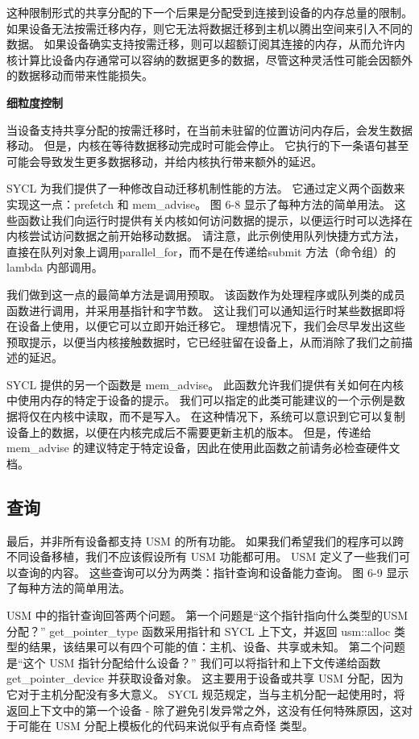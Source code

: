 这种限制形式的共享分配的下一个后果是分配受到连接到设备的内存总量的限制。 如果设备无法按需迁移内存，则它无法将数据迁移到主机以腾出空间来引入不同的数据。 如果设备确实支持按需迁移，则可以超额订阅其连接的内存，从而允许内核计算比设备内存通常可以容纳的数据更多的数据，尽管这种灵活性可能会因额外的数据移动而带来性能损失。

\textbf{细粒度控制}

当设备支持共享分配的按需迁移时，在当前未驻留的位置访问内存后，会发生数据移动。 但是，内核在等待数据移动完成时可能会停止。 它执行的下一条语句甚至可能会导致发生更多数据移动，并给内核执行带来额外的延迟。

SYCL 为我们提供了一种修改自动迁移机制性能的方法。 它通过定义两个函数来实现这一点：prefetch 和 mem\_advise。 图 6-8 显示了每种方法的简单用法。 这些函数让我们向运行时提供有关内核如何访问数据的提示，以便运行时可以选择在内核尝试访问数据之前开始移动数据。 请注意，此示例使用队列快捷方式方法，直接在队列对象上调用parallel\_for，而不是在传递给submit 方法（命令组）的 lambda 内部调用。

我们做到这一点的最简单方法是调用预取。 该函数作为处理程序或队列类的成员函数进行调用，并采用基指针和字节数。 这让我们可以通知运行时某些数据即将在设备上使用，以便它可以立即开始迁移它。 理想情况下，我们会尽早发出这些预取提示，以便当内核接触数据时，它已经驻留在设备上，从而消除了我们之前描述的延迟。

SYCL 提供的另一个函数是 mem\_advise。 此函数允许我们提供有关如何在内核中使用内存的特定于设备的提示。 我们可以指定的此类可能建议的一个示例是数据将仅在内核中读取，而不是写入。 在这种情况下，系统可以意识到它可以复制设备上的数据，以便在内核完成后不需要更新主机的版本。 但是，传递给 mem\_advise 的建议特定于特定设备，因此在使用此函数之前请务必检查硬件文档。

\subsection{查询}
最后，并非所有设备都支持 USM 的所有功能。 如果我们希望我们的程序可以跨不同设备移植，我们不应该假设所有 USM 功能都可用。 USM 定义了一些我们可以查询的内容。 这些查询可以分为两类：指针查询和设备能力查询。 图 6-9 显示了每种方法的简单用法。

USM 中的指针查询回答两个问题。 第一个问题是“这个指针指向什么类型的USM分配？” get\_pointer\_type 函数采用指针和 SYCL 上下文，并返回 usm::alloc 类型的结果，该结果可以有四个可能的值：主机、设备、共享或未知。 第二个问题是“这个 USM 指针分配给什么设备？” 我们可以将指针和上下文传递给函数 get\_pointer\_device 并获取设备对象。 这主要用于设备或共享 USM 分配，因为它对于主机分配没有多大意义。 SYCL 规范规定，当与主机分配一起使用时，将返回上下文中的第一个设备 - 除了避免引发异常之外，这没有任何特殊原因，这对于可能在 USM 分配上模板化的代码来说似乎有点奇怪 类型。

